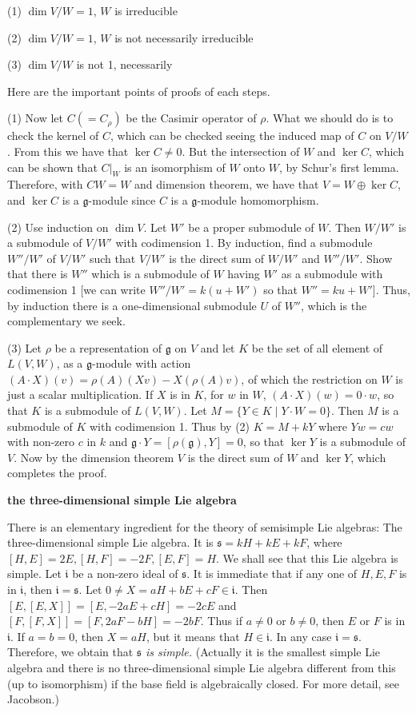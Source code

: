 \documentclass{article}
\newcommand{\SBar}{\;|\;}
\newcommand{\lie}[1]{\mathfrak{#1}}
\begin{document}
(1) $\dim{V/W} = 1$, $W$ is irreducible

(2) $\dim{V/W} = 1$, $W$ is not necessarily irreducible

(3) $\dim{V/W}$ is not 1, necessarily

Here are the important points of proofs of each steps.

(1) Now let $C (=C_\rho)$ be the Casimir operator of $\rho$.
What we should do is to check the kernel of $C$, which can be checked seeing the induced map of $C$ on $V/W$.
From this we have that $\ker{C} \ne 0$.
But the intersection of $W$ and $\ker{C}$, which can be shown that $C|_W$ is an isomorphism of $W$ onto $W$, by Schur’s first lemma.
Therefore, with $CW = W$ and dimension theorem, we have that $V = W \oplus \ker{C}$, and $\ker{C}$ is a $\lie{g}$-module since $C$ is a $\lie{g}$-module homomorphism.

(2) Use induction on $\dim{V}$. Let $W'$ be a proper submodule of $W$.
Then $W/W'$ is a submodule of $V/W'$ with codimension 1.
By induction, find a submodule $W''/W'$ of $V/W'$ such that $V/W'$ is the direct sum of $W/W'$ and $W''/W'$.
Show that there is $W''$ which is a submodule of $W$ having $W'$ as a submodule with codimension 1 [we can write $W''/W' = k(u + W')$ so that $W'' = ku + W'$].
Thus, by induction there is a one-dimensional submodule $U$ of $W''$, which is the complementary we seek.

(3) Let $\rho$ be a representation of $\lie{g}$ on $V$ and let $K$ be the set of all element of $L(V, W)$, as a $\lie{g}$-module with action $(A \cdot X)(v) = \rho(A)(Xv) - X(\rho(A)v)$, of which the restriction on $W$ is just a scalar multiplication.
If $X$ is in $K$, for $w$ in $W$, $(A \cdot X)(w) = 0 \cdot w$, so that $K$ is a submodule of $L(V, W)$. Let $M = \{Y \in K \SBar Y \cdot W=0\}$.
Then $M$ is a submodule of $K$ with codimension 1.
Thus by (2) $K = M + kY$ where $Yw = cw$ with non-zero $c$ in $k$ and $\lie{g} \cdot Y = [\rho(\lie{g}), Y] = 0$, so that $\ker{Y}$ is a submodule of $V$.
Now by the dimension theorem $V$ is the direct sum of $W$ and $\ker{Y}$, which completes the proof.

\newpage

\textbf{the three-dimensional simple Lie algebra}

There is an elementary ingredient for the theory of semisimple Lie algebras: The three-dimensional simple Lie algebra.
It is $\lie{s} = kH + kE + kF$, where $[H, E] = 2E, [H, F] = -2F, [E, F] = H$.
We shall see that this Lie algebra is simple.
Let $\lie{i}$ be a non-zero ideal of $\lie{s}$.
It is immediate that if any one of $H, E, F$ is in $\lie{i}$, then $\lie{i} = \lie{s}$.
Let $0 \ne X = aH + bE + cF \in \lie{i}$.
Then $[E, [E, X]] = [E, -2aE + cH] = -2cE$ and $[F, [F, X]] = [F, 2aF - bH] = -2bF$.
Thus if $a \ne 0$ or $b \ne 0$, then $E$ or $F$ is in $\lie{i}$.
If $a = b = 0$, then $X = aH$, but it means that $H \in \lie{i}$.
In any case $\lie{i} = \lie{s}$.
Therefore, we obtain that \textit{$\lie{s}$ is simple.}
(Actually it is the smallest simple Lie algebra and there is no three-dimensional simple Lie algebra different from this (up to isomorphism) if the base field is algebraically closed.
For more detail, see Jacobson.)
\end{document}
